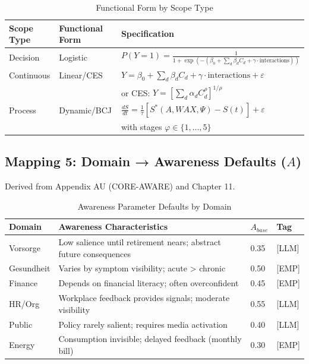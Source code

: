 \begin{table}[htbp]
\centering
\caption{Functional Form by Scope Type}
\label{tab:ggg-form-mapping}
\renewcommand{\arraystretch}{1.4}
\begin{tabular}{@{}llp{5cm}@{}}
\toprule
\textbf{Scope Type} & \textbf{Functional Form} & \textbf{Specification} \\
\midrule
Decision & Logistic & $P(Y=1) = \frac{1}{1+\exp(-(\beta_0 + \sum_d \beta_d C_d + \gamma \cdot \text{interactions}))}$ \\
\addlinespace
Continuous & Linear/CES & $Y = \beta_0 + \sum_d \beta_d C_d + \gamma \cdot \text{interactions} + \varepsilon$ \\
& & or CES: $Y = [\sum_d \alpha_d C_d^\rho]^{1/\rho}$ \\
\addlinespace
Process & Dynamic/BCJ & $\frac{dS}{dt} = \frac{1}{\tau}[S^*(A, WAX, \Psi) - S(t)] + \varepsilon$ \\
& & with stages $\varphi \in \{1,...,5\}$ \\
\bottomrule
\end{tabular}
\end{table}


\subsection{Mapping 5: Domain → Awareness Defaults ($A$)}

Derived from Appendix AU (CORE-AWARE) and Chapter 11.

\begin{table}[htbp]
\centering
\caption{Awareness Parameter Defaults by Domain}
\label{tab:ggg-awareness-mapping}
\renewcommand{\arraystretch}{1.3}
\begin{tabular}{@{}lp{4cm}ll@{}}
\toprule
\textbf{Domain} & \textbf{Awareness Characteristics} & \textbf{$A_{base}$} & \textbf{Tag} \\
\midrule
Vorsorge & Low salience until retirement nears; abstract future consequences & 0.35 & [LLM] \\
Gesundheit & Varies by symptom visibility; acute > chronic & 0.50 & [EMP] \\
Finance & Depends on financial literacy; often overconfident & 0.45 & [EMP] \\
HR/Org & Workplace feedback provides signals; moderate visibility & 0.55 & [LLM] \\
Public & Policy rarely salient; requires media activation & 0.40 & [LLM] \\
Energy & Consumption invisible; delayed feedback (monthly bill) & 0.30 & [EMP] \\
\bottomrule
\end{tabular}
\end{table}

